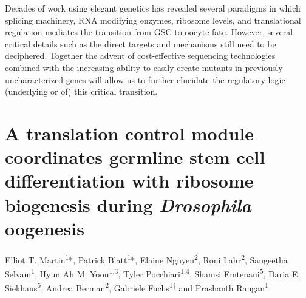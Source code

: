 \documentclass[12pt,oneside]{reedthesis}
\begin{document}
Decades of work using elegant genetics has revealed several paradigms in
which splicing machinery, RNA modifying enzymes, ribosome levels, and
translational regulation mediates the transition from GSC to oocyte
fate. However, several critical details such as the direct targets and
mechanisms still need to be deciphered. Together the advent of
cost-effective sequencing technologies combined with the increasing
ability to easily create mutants in previously uncharacterized genes
will allow us to further elucidate the regulatory logic (underlying or
of) this critical transition.

























































\hypertarget{a-translation-control-module-coordinates-germline-stem-cell-differentiation-with-ribosome-biogenesis-during-drosophila-oogenesis}{%
\chapter{\texorpdfstring{A translation control module coordinates germline stem cell differentiation with ribosome biogenesis during \emph{Drosophila} oogenesis}{A translation control module coordinates germline stem cell differentiation with ribosome biogenesis during Drosophila oogenesis}}\label{a-translation-control-module-coordinates-germline-stem-cell-differentiation-with-ribosome-biogenesis-during-drosophila-oogenesis}}

Elliot T. Martin\textsuperscript{1}*, Patrick Blatt\textsuperscript{1}*, Elaine Nguyen\textsuperscript{2}, Roni Lahr\textsuperscript{2}, Sangeetha Selvam\textsuperscript{1}, Hyun Ah M. Yoon\textsuperscript{1,3}, Tyler Pocchiari\textsuperscript{1,4}, Shamsi Emtenani\textsuperscript{5}, Daria E. Siekhaus\textsuperscript{5}, Andrea Berman\textsuperscript{2}, Gabriele Fuchs\textsuperscript{1†} and Prashanth Rangan\textsuperscript{1†}
\end{document}
